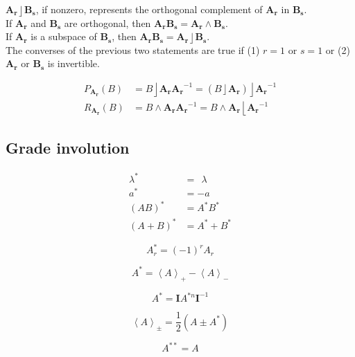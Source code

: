 \documentclass{utarticle}
\newcommand{\bl}[1]{\ensuremath{\bm{#1}}}
\newcommand{\I}{\bl{I}}
\DeclareMathOperator{\lin}{\rfloor}
\DeclareMathOperator{\rin}{\lfloor}
\DeclareMathOperator{\out}{\wedge}
\newcommand{\grinv}[2][]{\ensuremath{#2^{*#1}}}
\newcommand{\doublegrinv}[1]{\ensuremath{#1^{**}}}
\newcommand{\grade}[2][]{\ensuremath{\left\langle #2 \right\rangle_{#1}}}
\newcommand{\half}{\ensuremath{\frac{1}{2}}}
\begin{document}
\noindent $\bl{A_r} \lin \bl{B_s}$, if nonzero, represents the orthogonal 
complement of \bl{A_r} in \bl{B_s}. \\

\noindent If \bl{A_r} and \bl{B_s} are orthogonal, then $\bl{A_r} \bl{B_s} = \bl{A_r} \out 
\bl{B_s}$. \\

\noindent If \bl{A_r} is a subspace of \bl{B_s}, then $\bl{A_r} \bl{B_s} = \bl{A_r} \lin \bl{B_s}$. \\

\noindent The converses of the previous two statements are true if (1) $r=1$ or $s=1$ or 
(2) \bl{A_r} or \bl{B_s} is invertible.

\begin{align}
P_{\bl{A_r}}(B) & = B \lin \bl{A_r} \bl{A_r}^{-1} = (B \lin \bl{A_r}) \lin \bl{A_r}^{-1} \\
R_{\bl{A_r}}(B) & = B \out \bl{A_r} \bl{A_r}^{-1} = B \out \bl{A_r} \rin \bl{A_r}^{-1}
\end{align}

\subsection{Grade involution}
\label{app:grinv}

\begin{align}
\grinv{\lambda} & = \ \ \lambda \\
\grinv{a} & = -a \\
\grinv{(AB)} & = \grinv{A} \grinv{B} \\
\grinv{(A + B)} & = \grinv{A} + \grinv{B}
\end{align}

\begin{equation} \grinv{A_r} = (-1)^r A_r  \end{equation}

\begin{equation} 
\grinv{A} = \grade[+]{A} - \grade[-]{A} 
\end{equation}

\begin{equation} 
\grinv{A} = \I \grinv[n]{A} \I^{-1}
\end{equation}

\begin{equation}
\grade[\pm]{A} = \half (A \pm \grinv{A})
\end{equation}

\begin{equation} \doublegrinv{A} = A \end{equation} 
\end{document}
